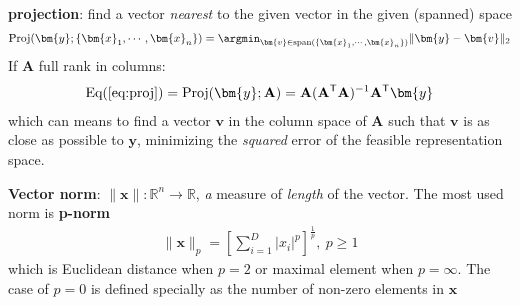 \textbf{projection}: find a vector \textit{nearest} to the given vector in the given (spanned) space
\begin{gather}
    \text{Proj}(\bm{y};\{\bm{x}_1,\cdots,\bm{x}_n\})
    =\argmin_{\bm{v}\in\text{span}(\{\bm{x}_1,\cdots,\bm{x}_n\})}\|\bm{y}-\bm{v}\|_2\label{eq:proj}
\end{gather}
If $\mathbf{A}$ full rank in columns:
\begin{gather}
    \mathrm{Eq(\ref{eq:proj})}=\text{Proj}(\bm{y};\mathbf{A})
    =\mathbf{A}(\mathbf{A}^\mathsf{T}\mathbf{A})^{-1}\mathbf{A}^\mathsf{T}\bm{y}
\end{gather}
which can means to find a vector $\bm{v}$ in the column space of $\mathbf{A}$ 
such that $\bm{v}$ is as close as possible to $\bm{y}$,
minimizing the \textit{squared} error of the feasible representation space.

\textbf{Vector norm}:
$\|\bm{x}\|:\mathbb{R}^n\to\mathbb{R}$, \textit{a} measure of \textit{length} of the vector.
The most used norm is \textbf{p-norm}
\begin{gather}
    \|\bm{x}\|_p=\left[\sum_{i=1}^D |x_i|^p\right]^\frac{1}{p},~p\geq{1}
\end{gather}
which is Euclidean distance when $p=2$ or maximal element when $p=\infty$. 
The case of $p=0$ is defined specially as the number of non-zero elements in $\bm{x}$

